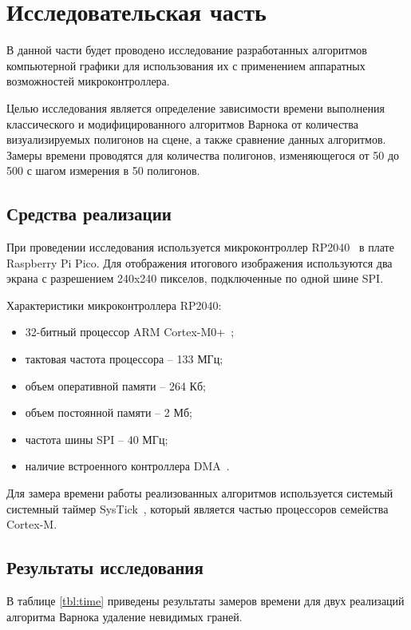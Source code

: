 \chapter{Исследовательская часть}

В данной части будет проводено исследование разработанных алгоритмов компьютерной графики для использования их с применением аппаратных возможностей микроконтроллера. 

Целью исследования является определение зависимости времени выполнения классического и модифицированного алгоритмов Варнока от количества визуализируемых полигонов на сцене, а также сравнение данных алгоритмов. Замеры времени проводятся для количества полигонов, изменяющегося от 50 до 500 с шагом измерения в 50 полигонов. 

\section{Средства реализации}
При проведении исследования используется микроконтроллер RP2040~\cite{rp2040} в плате Raspberry Pi Pico. Для отображения итогового изображения используются два экрана с разрешением 240x240 пикселов, подключенные по одной шине SPI. 

Характеристики микроконтроллера RP2040:
\begin{itemize}
    \item 32-битный процессор ARM Cortex-M0+~\cite{cortex-m0};
    \item тактовая частота процессора -- 133 МГц;
    \item объем оперативной памяти -- 264 Кб;
    \item объем постоянной памяти -- 2 Мб;
    \item частота шины SPI -- 40 МГц;
    \item наличие встроенного контроллера DMA~\cite{dma}. 
\end{itemize}

Для замера времени работы реализованных алгоритмов используется системый системный таймер SysTick~\cite{systick}, который является частью процессоров семейства Cortex-M. 

\section{Результаты исследования}
В таблице \ref{tbl:time} приведены результаты замеров времени для двух реализаций алгоритма Варнока удаление невидимых граней.

